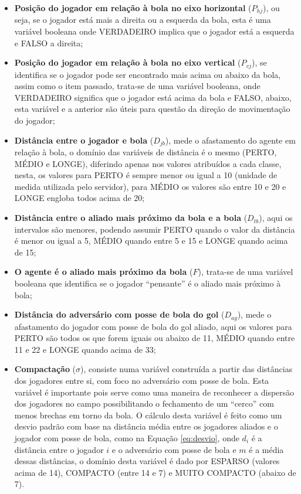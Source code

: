 \begin{itemize}
    \item \textbf{Posição do jogador em relação à bola no eixo horizontal}
    ($P_{hj}$), ou seja, se o jogador está mais a direita ou a esquerda da
    bola, esta é uma variável booleana onde VERDADEIRO implica
    que o jogador está a esquerda e FALSO a direita;
    \item \textbf{Posição do jogador em relação à bola no eixo vertical}
    ($P_{vj}$), se identifica se o jogador pode ser encontrado mais acima ou
    abaixo da bola, assim como o item passado, trata-se de uma variável
    booleana, onde VERDADEIRO significa que o jogador está acima da bola e FALSO, abaixo,
    esta variável e a anterior são úteis para questão da direção de movimentação
    do jogador;
    \item \textbf{Distância entre o jogador e bola} ($D_{jb}$), mede o
    afastamento do agente em relação à bola, o domínio das
    variáveis de distância é o mesmo (PERTO, MÉDIO e LONGE), diferindo
    apenas nos valores atribuídos a cada classe, nesta, os valores para PERTO é
    sempre menor ou igual a 10 (unidade de medida utilizada pelo servidor), para
    MÉDIO os valores são entre 10 e 20 e LONGE engloba todos acima de 20;
    \item \textbf{Distância entre o aliado mais próximo da bola e a bola}
    ($D_{tb}$), aqui os intervalos são menores, podendo assumir PERTO quando o
    valor da distância é menor ou igual a 5, MÉDIO quando entre 5 e 15 e LONGE
    quando acima de 15;
    \item \textbf{O agente é o aliado mais próximo da bola} ($F$), trata-se de
    uma variável booleana que identifica se o jogador ``pensante'' é o aliado
    mais próximo à bola;
    \item \textbf{Distância do adversário com posse de bola do gol} ($D_{ag}$),
    mede o afastamento do jogador com posse de bola do gol aliado, aqui os
    valores para PERTO são todos os que forem iguais ou abaixo de 11, MÉDIO
    quando entre 11 e 22 e LONGE quando acima de 33;
    \item \textbf{Compactação} ($\sigma$), consiste numa variável construída a
    partir das distâncias dos jogadores entre si, com foco no adversário com
    posse de bola. Esta variável é importante pois serve como uma maneira de
    reconhecer a dispersão dos jogadores no campo possibilitando o fechamento de
    um ``cerco'' com menos brechas em torno da bola. O cálculo desta variável é
    feito como um desvio padrão com base na distância média entre os jogadores
    aliados e o jogador com posse de bola, como na Equação \ref{eq:desvio}, onde
    $d_i$ é a distância entre o jogador $i$ e o adversário com posse de bola e
    $m$ é a média dessas distâncias, o domínio desta variável é dado por
    ESPARSO (valores acima de 14), COMPACTO (entre 14 e 7) e MUITO COMPACTO
    (abaixo de 7).
\end{itemize}


